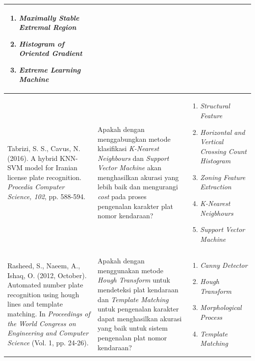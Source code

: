 \begin{small}
\begin{longtable}{ |p{5cm}|p{3.5cm}|p{3.6cm}| }
\begin{enumerate}[wide, labelwidth=!, labelindent=0pt, topsep=0pt]
\item \textit{Maximally Stable Extremal Region}
\item \textit{Histogram of Oriented Gradient}
\item \textit{Extreme Learning Machine}
\end{enumerate}\\
\hline
Tabrizi, S. S., Cavus, N. (2016). A hybrid KNN-SVM model for Iranian license plate recognition. \emph{Procedia Computer Science, 102}, pp. 588-594. & Apakah dengan menggabungkan metode klasifikasi \textit{K-Nearest Neighbours} dan \textit{Support Vector Machine} akan menghasilkan akurasi yang lebih baik dan mengurangi \textit{cost} pada proses pengenalan karakter plat nomor kendaraan? &
\begin{enumerate}[wide, labelwidth=!, labelindent=0pt, topsep=0pt]
\item \textit{Structural Feature}
\item \textit{Horizontal and Vertical Crossing Count Histogram}
\item \textit{Zoning Feature Extraction}
\item \textit{K-Nearest Neigbhours}
\item \textit{Support Vector Machine}
\end{enumerate}\\
\hline
Rasheed, S., Naeem, A., Ishaq, O. (2012, October). Automated number plate recognition using hough lines and template matching. In \emph{Proceedings of the World Congress on Engineering and Computer Science} (Vol. 1, pp. 24-26). & Apakah dengan menggunakan metode \textit{Hough Transform} untuk mendeteksi plat kendaraan dan \textit{Template Matching} untuk pengenalan karakter dapat menghasilkan akurasi yang baik untuk sistem pengenalan plat nomor kendaraan? &
\begin{enumerate}[wide, labelwidth=!, labelindent=0pt, topsep=0pt]
	\item \textit{Canny Detector}
	\item \textit{Hough Transform}
	\item \textit{Morphological Process}
	\item \textit{Template Matching}
\end{enumerate}
\label{tbl:StateoftheArt}\\
\hline
\end{longtable}
\end{small}
\endgroup
 
